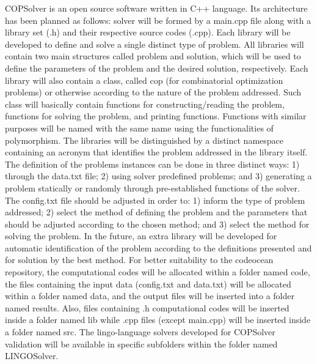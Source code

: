 \documentclass[11pt, letterpaper]{article}
\begin{document}
COPSolver is an open source software written in C++ language. Its architecture has been planned as follows: solver will be formed by a main.cpp file along with a library set (.h) and their respective source codes (.cpp). Each library will be developed to define and solve a single distinct type of problem. All libraries will contain two main structures called problem and solution, which will be used to define the parameters of the problem and the desired solution, respectively. Each library will also contain a class, called cop (for combinatorial optimization problems) or otherwise according to the nature of the problem addressed. Such class will basically contain functions for constructing/reading the problem, functions for solving the problem, and printing functions. Functions with similar purposes will be named with the same name using the functionalities of polymorphism. The libraries will be distinguished by a distinct namespace containing an acronym that identifies the problem addressed in the library itself. The definition of the problems instances can be done in three distinct ways: 1) through the data.txt file; 2) using solver predefined problems; and 3) generating a problem statically or randomly through pre-established functions of the solver. The config.txt file should be adjusted in order to: 1) inform the type of problem addressed; 2) select the method of defining the problem and the parameters that should be adjusted according to the chosen method; and 3) select the method for solving the problem. In the future, an extra library will be developed for automatic identification of the problem according to the definitions presented and for solution by the best method. For better suitability to the codeocean repository, the computational codes will be allocated within a folder named code, the files containing the input data (config.txt and data.txt) will be allocated within a folder named data, and the output files will be inserted into a folder named results. Also, files containing .h computational codes will be inserted inside a folder named lib while .cpp files (except main.cpp) will be inserted inside a folder named src. The lingo-language solvers developed for COPSolver validation will be available in specific subfolders within the folder named LINGOSolver.
\end{document}
